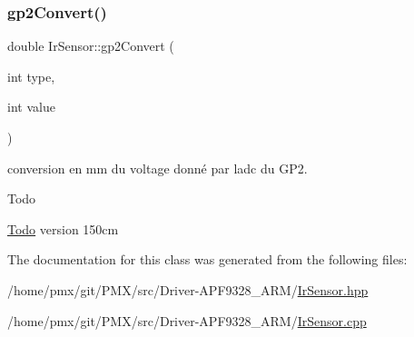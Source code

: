 \subsubsection{\texorpdfstring{gp2\+Convert()}{gp2Convert()}}
{\footnotesize\ttfamily double Ir\+Sensor\+::gp2\+Convert (\begin{DoxyParamCaption}\item[{int}]{type,  }\item[{int}]{value }\end{DoxyParamCaption})}



conversion en mm du voltage donné par l\textquotesingle{}adc du G\+P2. 

\begin{DoxyRefDesc}{Todo}
\item[\hyperlink{todo__todo000057}{Todo}]version 150cm \end{DoxyRefDesc}


The documentation for this class was generated from the following files\+:\begin{DoxyCompactItemize}
\item 
/home/pmx/git/\+P\+M\+X/src/\+Driver-\/\+A\+P\+F9328\+\_\+\+A\+R\+M/\hyperlink{Driver-APF9328__ARM_2IrSensor_8hpp}{Ir\+Sensor.\+hpp}\item 
/home/pmx/git/\+P\+M\+X/src/\+Driver-\/\+A\+P\+F9328\+\_\+\+A\+R\+M/\hyperlink{Driver-APF9328__ARM_2IrSensor_8cpp}{Ir\+Sensor.\+cpp}\end{DoxyCompactItemize}
